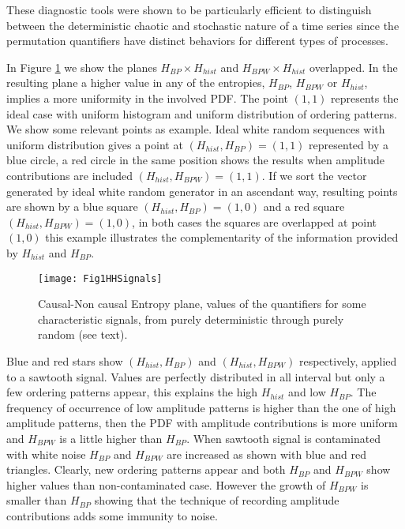 These diagnostic tools were shown to be particularly efficient to distinguish between the deterministic chaotic and stochastic nature of a time series since the permutation quantifiers have distinct behaviors for different types of processes.

In Figure \ref{fig:HH} we show the planes $H_{BP} \times H_{hist}$ and $H_{BPW} \times H_{hist}$ overlapped.
In the resulting plane a higher value in any of the entropies, $H_{BP}$, $H_{BPW}$ or $H_{hist}$, implies a more uniformity in the involved PDF.
The point $(1,1)$ represents the ideal case with uniform histogram and uniform distribution of ordering patterns.
We show some relevant points as example.
Ideal white random sequences with uniform distribution gives a point at $(H_{hist}, H_{BP})=(1, 1)$ represented by a blue circle, a red circle in the same position shows the results when amplitude contributions are included $(H_{hist}, H_{BPW})=(1, 1)$.
If we sort the vector generated by ideal white random generator in an ascendant way, resulting points are shown by a blue square $(H_{hist}, H_{BP})=(1, 0)$ and a red square $(H_{hist}, H_{BPW})=(1, 0)$, in both cases the squares are overlapped at point $(1, 0)$ this example illustrates the complementarity of the information provided by $H_{hist}$ and $H_{BP}$.
%
\begin{figure}[H]
	\centering	
	\texttt{[image: Fig1HHSignals]}
	\caption{Causal-Non causal Entropy plane, values of the quantifiers for some characteristic signals, from purely deterministic through purely random (see text).}
	\label{fig:HH}
\end{figure}

Blue and red stars show $(H_{hist}, H_{BP})$ and $(H_{hist}, H_{BPW})$ respectively, applied to a sawtooth signal.
Values are perfectly distributed in all interval but only a few ordering patterns appear, this explains the high $H_{hist}$ and low $H_{BP}$.
The frequency of occurrence of low amplitude patterns is higher than the one of high amplitude patterns, then the PDF with amplitude contributions is more uniform and $H_{BPW}$ is a little higher than $H_{BP}$.
When sawtooth signal is contaminated with white noise $H_{BP}$ and $H_{BPW}$ are increased as shown with blue and red triangles.
Clearly, new ordering patterns appear and both $H_{BP}$ and $H_{BPW}$ show higher values than non-contaminated case.
However the growth of $H_{BPW}$ is smaller than $H_{BP}$ showing that the technique of recording amplitude contributions adds some immunity to noise.

